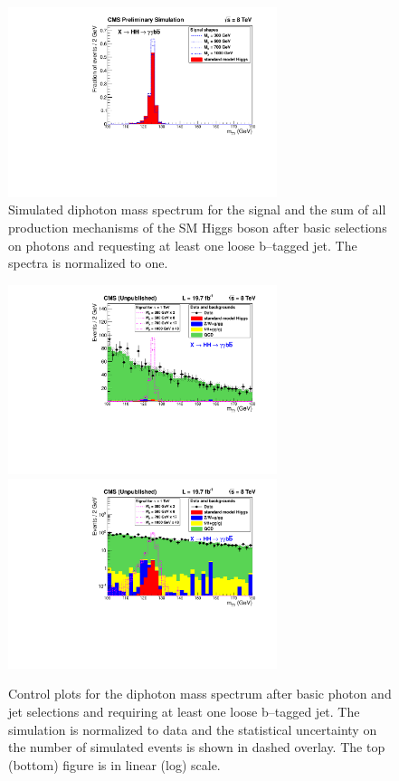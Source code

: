 \begin{figure}[ht]
 \begin{center}
    \includegraphics[width=0.70\textwidth]{figures/objects/DiPhotonMass_OnlyHiggs.pdf}
 \end{center}
\caption{Simulated diphoton mass spectrum for the signal and the sum of all production mechanisms of the
SM Higgs boson after basic selections on photons and requesting at least one loose b--tagged jet.
The spectra is normalized to one.}
\label{fig:mgg_onlyhiggs}
\end{figure}

\begin{figure}[ht]
 \begin{center}
   \includegraphics[width=0.70\textwidth]{figures/objects/DiPhotonMass_ShapeNormalized_sys.pdf}
   \includegraphics[width=0.70\textwidth]{figures/objects/DiPhotonMass_ShapeNormalized_Log_sys.pdf}
 \end{center}
\caption{Control plots for the diphoton mass spectrum after basic photon and jet selections
and requiring at least one loose b--tagged jet. The simulation is normalized to data and
the statistical uncertainty on the number of simulated events is shown in dashed overlay.
The top (bottom) figure is in linear (log) scale.}
\label{fig:mgg_controlplot}
\end{figure}

